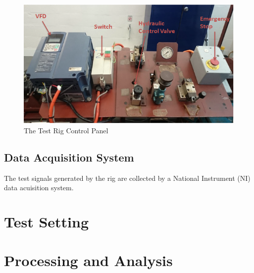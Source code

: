 \begin{figure}
	\centering
	\includegraphics{control}
	\caption{The Test Rig Control Panel}
	\label{control panel}
\end{figure}

\subsection{Data Acquisition System}

The test signals generated by the rig are collected by a National Instrument (NI) data acuisition system. 



\section{Test Setting}







\section{Processing and Analysis}
